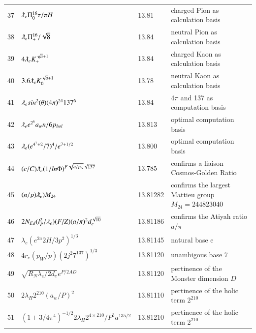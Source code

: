 \documentclass[a4paper,9pt]{article}
\begin{document}
\begin{appendix}
\begin{table}
\begin{tabular}{llll}
   37 & $\lambdabar_{e} \Pi_0^{16} \tau/\pi H $ & 13.81 & charged Pion as calculation basis \\    
   38 & $\lambdabar_{e} \Pi_+^{16} /\sqrt 8 $ & 13.84 &  neutral Pion as calculation basis \\
   39 & $ 4 \lambdabar_{e} K_+^{\sqrt a + 1} $ & 13.84 & charged Kaon as calculation basis \\
   40 & $3.6 \lambdabar_{e} K_0^{\sqrt a + 1}$ & 13.78 & neutral Kaon as calculation basis \\
   41 & $ \lambdabar_{e} sin^2(\theta) (4\pi)^{24} 137^6 $ & 13.84 & $4\pi$ and 137 as computation basis \\
   
    42 & $ \lambdabar_{e} e^{2^6} a_w n/6p_{hol} $ & 13.813 &  optimal computation basis \\
    
    43 & $ \lambdabar_{e} (e^{4^7+2}/7)^4 /e^{7+1/2}$ & 13.800 &  optimal computation basis \\
    
    44 & $ (c/C)\lambdabar_{e} (1/ln\Phi)^{F \sqrt{a/p_G} \sqrt{137}}$ & 13.785 &  confirms a liaison Cosmos-Golden Ratio\\
    45 & $ (n/p)\lambdabar_e) M_{24} $ & 13.81282 & confirms the largest Mattieu group $M_{24} = 244823040 $\\   
    46 & $2N_{Ed}(l_P^2/\lambdabar_e) (F/Z) (a/\pi)^2 d_e^{\sqrt{10}} $ & 13.81186 & confirms the Atiyah ratio $a/\pi$\\ 
    47& $\lambda_{e} (e^{2a}2H/3p^2)^{1/3}$ & 13.81145 & natural base e\\
    48& $4r_e (p_W/p) (2j^2 7^{137})^{1/3} $ & 13.81120 & unambigous base 7 \\
    49& $ \sqrt{R_N \lambda_{e} /2d_e} e^{P/2AD} $ & 13.81120 & pertinence of the Monster dimension $D$ \\
    50& $ 2\lambda_{H} 2^{210} (a_w/P)^2 $ & 13.81110 & pertinence of the holic term $2^{210}$ \\
    51& $(1+3/4\pi^4)^{-1/2}  2\lambda_{H} 2^{4\times210}/P^3 a^{135/2}  $ & 13.81210 & pertinence of the holic term $2^{210} $\\
    
    
    
    
    
     
    \bottomrule
  \end{tabular}
\end{table}




\end{appendix}
\end{document}
